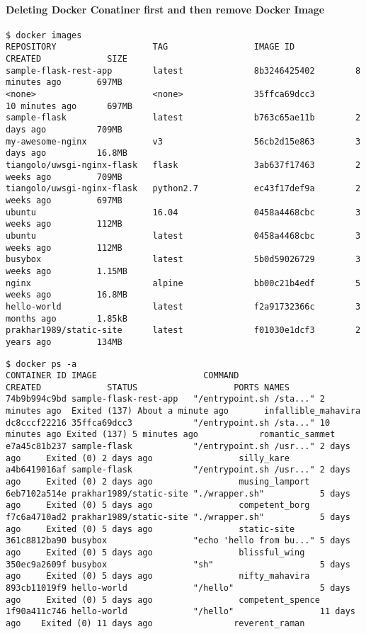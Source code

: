 \paragraph{Deleting Docker Conatiner first and then remove Docker Image}


\begin{lstlisting}[basicstyle=\tiny\ttfamily]
$ docker images
REPOSITORY                   TAG                 IMAGE ID            CREATED             SIZE
sample-flask-rest-app        latest              8b3246425402        8 minutes ago       697MB
<none>                       <none>              35ffca69dcc3        10 minutes ago      697MB
sample-flask                 latest              b763c65ae11b        2 days ago          709MB
my-awesome-nginx             v3                  56cb2d15e863        3 days ago          16.8MB
tiangolo/uwsgi-nginx-flask   flask               3ab637f17463        2 weeks ago         709MB
tiangolo/uwsgi-nginx-flask   python2.7           ec43f17def9a        2 weeks ago         697MB
ubuntu                       16.04               0458a4468cbc        3 weeks ago         112MB
ubuntu                       latest              0458a4468cbc        3 weeks ago         112MB
busybox                      latest              5b0d59026729        3 weeks ago         1.15MB
nginx                        alpine              bb00c21b4edf        5 weeks ago         16.8MB
hello-world                  latest              f2a91732366c        3 months ago        1.85kB
prakhar1989/static-site      latest              f01030e1dcf3        2 years ago         134MB
\end{lstlisting}


\begin{lstlisting}[basicstyle=\tiny\ttfamily]
$ docker ps -a
CONTAINER ID IMAGE                     COMMAND                  CREATED             STATUS                   PORTS NAMES
74b9b994c9bd sample-flask-rest-app   "/entrypoint.sh /sta..." 2 minutes ago  Exited (137) About a minute ago       infallible_mahavira
dc8cccf22216 35ffca69dcc3            "/entrypoint.sh /sta..." 10 minutes ago Exited (137) 5 minutes ago            romantic_sammet
e7a45c81b237 sample-flask            "/entrypoint.sh /usr..." 2 days ago     Exited (0) 2 days ago                 silly_kare
a4b6419016af sample-flask            "/entrypoint.sh /usr..." 2 days ago     Exited (0) 2 days ago                 musing_lamport
6eb7102a514e prakhar1989/static-site "./wrapper.sh"           5 days ago     Exited (0) 5 days ago                 competent_borg
f7c6a4710ad2 prakhar1989/static-site "./wrapper.sh"           5 days ago     Exited (0) 5 days ago                 static-site
361c8812ba90 busybox                 "echo 'hello from bu..." 5 days ago     Exited (0) 5 days ago                 blissful_wing
350ec9a2609f busybox                 "sh"                     5 days ago     Exited (0) 5 days ago                 nifty_mahavira
893cb11019f9 hello-world             "/hello"                 5 days ago     Exited (0) 5 days ago                 competent_spence
1f90a411c746 hello-world             "/hello"                 11 days ago    Exited (0) 11 days ago                reverent_raman
\end{lstlisting}

